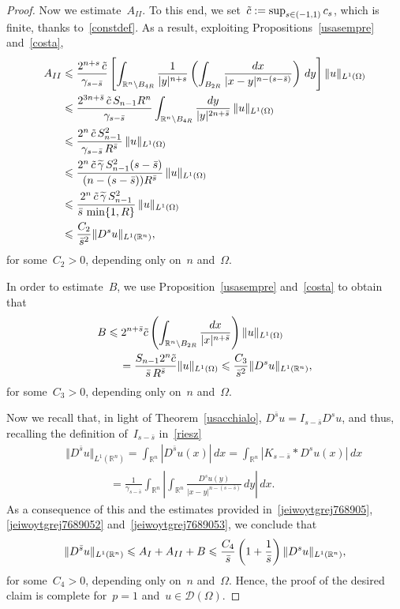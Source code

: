 \documentclass[10pt,a4paper]{amsart}
\newcommand{\Int}{\int_{\mathbb{R}^n}}
\newcommand{\R}{\mathbb{R}}
\newcommand{\bs}{\Bar{s}}
\renewcommand{\le}{\leqslant}
\renewcommand{\leq}{\leqslant}
\begin{document}
\begin{proof}
Now we estimate~$A_{II}$. 
To this end, we set~$\Tilde{c}:= \sup_{s \in(-1,1)} c_{s}$, which is finite, thanks to~\eqref{constdef}.
As a result, 
exploiting Propositions~\ref{usasempre} and~\ref{costa},
\begin{equation}\label{jeiwoytgrej7689052}\begin{split}
			A_{II}& \leq \frac{ 2 ^{n+s}\,\Tilde{c}}{\gamma_{s-\bar{s}}} \left[ \int_{\R^n \setminus B_{4R}} \frac{1}{|y|^{n+s}} \left( \int_{B_{2R}} \frac{dx}{|x-y|^{n-(s-\bar{s})}} \right) \, dy \right] \Vert u \Vert_{L^1(\Omega)}	 \\ 
& \leq \frac{ 2^{3n+\bs}\,\Tilde{c} \,S_{n-1} R^n}{\gamma_{s-\bar{s}}} \int_{\R^n \setminus B_{4R}} \frac{dy}{|y|^{2n + \bar{s}}}\,\Vert u \Vert_{L^1(\Omega)}  \\&
\le\frac{ 2^{n}\,\Tilde{c} \,S^2_{n-1}}{\gamma_{s-\bar{s}} \, R^{\bs} } \,\Vert u \Vert_{L^1(\Omega)} \\
& \le 
\frac{ 2^{n}\,\Tilde{c} \,\widetilde\gamma\,S^2_{n-1}(s-\bs)}{(n-(s-\bs)) R^{\bs} } \,\Vert u \Vert_{L^1(\Omega)}\\& \le
\frac{ 2^{n}\,\Tilde{c} \,\widetilde\gamma\,S^2_{n-1}}{\bs\,\min\{1, R\} } \,\Vert u \Vert_{L^1(\Omega)}\\&
\le\frac{ C_2}{\bar{s}^2} \Vert D^s u \Vert_{L^1(\R^n)},
			\end{split}\end{equation} for some~$ C_2>0$, depending
			only on~$n$ and~$\Omega$.

In order to estimate~$B$, we use Proposition~\ref{usasempre} and~\ref{costa}
to obtain that
\begin{equation}\label{jeiwoytgrej7689053}\begin{split}&
B \leq 2^{n+\bar{s}} \Tilde{c} \left( \int_{\R^n \setminus B_{2R}}\frac{dx}{|x|^{n+\bs}}\right) \Vert u \Vert_{L^1(\Omega)} 
\\&\qquad= \frac{ S_{n-1} 2^{n} \Tilde{c}}{\bar{s}\,R^{\bar{s}}}  \Vert u \Vert_{L^1(\Omega)}
\leq \frac{C_3}{\bar{s}^2} \Vert  D^s u \Vert_{L^1(\R^n)},\end{split}
\end{equation} for some~$C_3>0$, depending only on~$n$ and~$\Omega$.
			
Now we recall that, in light of Theorem~\ref{usacchialo}, $D^{\bar{s}}u =I_{s-\bar{s}} D^s u$, and thus, recalling the definition of~$I_{s-\bar{s}}$ 
in~\eqref{riesz}
\begin{eqnarray*}&& \Vert D^{\bar{s}}u \Vert_{L^1(\R^n)}=\int_{\R^n}| D^{\bar{s}}u(x)|\,dx
=\int_{\R^n}| K_{s-\bar s} \ast D^su(x)|\,dx\\&&\qquad\qquad
=\frac{1}{\gamma_{s-\bar s}}\int_{\R^n}\left|
\Int \frac{D^su(y)}{|x-y|^{n-(s-\bar s)}} \, dy\right|\,dx.\end{eqnarray*}
As a consequence of this and the estimates provided in~\eqref{jeiwoytgrej768905},
\eqref{jeiwoytgrej7689052} and~\eqref{jeiwoytgrej7689053}, we conclude that
$$
\Vert D^{\bar{s}}u \Vert_{L^1(\R^n)} \leq A_{I} + A_{II} + B\le\frac{C_4}{\bs}\left(1+\frac{1}{\bs}\right) \Vert  D^s u \Vert_{L^1(\R^n)},
$$ for some~$C_4>0$, depending only on~$n$ and~$\Omega$.
Hence, the proof of the desired claim
is complete for~$p=1$ and~$u \in \mathcal{D}(\Omega)$.
			

\end{proof}
\end{document}
